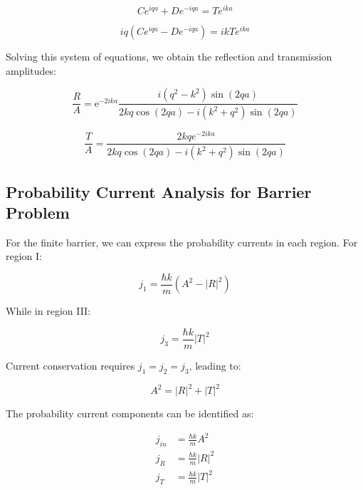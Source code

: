 \documentclass[italian]{HKNdocument}
\begin{document}
\begin{equation}
C e^{i q a}+D e^{-i q a}=T e^{i k a}
\end{equation}

\begin{equation}
i q\left(C e^{i q a}-D e^{-i q a}\right)=i k T e^{i k a}
\end{equation}

Solving this system of equations, we obtain the reflection and transmission amplitudes:

\begin{equation}
\frac{R}{A}=\mathrm{e}^{-2 i k a} \frac{i\left(q^{2}-k^{2}\right) \sin (2 q a)}{2 k q \cos (2 q a)-i\left(k^{2}+q^{2}\right) \sin (2 q a)}
\end{equation}

\begin{equation}
\frac{T}{A}=\frac{2 k q e^{-2 i k a}}{2 k q \cos (2 q a)-i\left(k^{2}+q^{2}\right) \sin (2 q a)}
\end{equation}


\subsection{Probability Current Analysis for Barrier Problem}

For the finite barrier, we can express the probability currents in each region. For region I:

\begin{equation}
j_{1}=\frac{\hbar k}{m}\left(A^{2}-|R|^{2}\right)
\end{equation}

While in region III:

\begin{equation}
j_{3}=\frac{\hbar k}{m}|T|^{2}
\end{equation}

Current conservation requires $j_1 = j_2 = j_3$, leading to:

\begin{equation}
A^{2}=|R|^{2}+|T|^{2}
\end{equation}

The probability current components can be identified as:

\begin{align}
j_{i n} & =\frac{\hbar k}{m} A^{2} \\
j_{R} & =\frac{\hbar k}{m}|R|^{2}  \\
j_{T} & =\frac{\hbar k}{m}|T|^{2}
\end{align}
\end{document}
